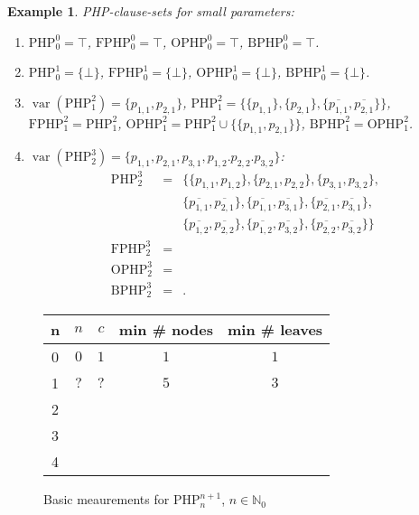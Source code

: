\documentclass{report}
\newtheorem{examp}[defi]{Example}
\newcommand{\set}[1]{\{ #1 \}}
\newcommand{\ol}{\overline}
\newcommand{\NN}{\mathbb{N}}
\newcommand{\NNZ}{\NN_0}
\DeclareMathOperator{\var}{var}
\newcommand{\php}{\mathrm{PHP}}
\newcommand{\fphp}{\mathrm{FPHP}} %
\newcommand{\ophp}{\mathrm{OPHP}} %
\newcommand{\ofphp}{\mathrm{BPHP}} %
\begin{document}
\begin{examp}\label{exp:PHPdef}
  PHP-clause-sets for small parameters:
  \begin{enumerate}
  \item $\php^0_0 = \top$, $\fphp^0_0 = \top$, $\ophp^0_0 = \top$, $\ofphp^0_0 = \top$.
  \item $\php^1_0 = \set{\bot}$, $\fphp^1_0 = \set{\bot}$, $\ophp^1_0 = \set{\bot}$, $\ofphp^1_0 = \set{\bot}$.
  \item $\var(\php^2_1) = \set{p_{1,1},p_{2,1}}$, $\php^2_1 = \set{\set{p_{1,1}}, \set{p_{2,1}}, \set{\ol{p_{1,1}},\ol{p_{2,1}}}}$, $\fphp^2_1 = \php^2_1$, $\ophp^2_1 = \php^2_1 \cup \set{\set{p_{1,1},p_{2,1}}}$, $\ofphp^2_1 = \ophp^2_1$.
  \item $\var(\php^3_2) = \set{p_{1,1},p_{2,1}, p_{3,1},p_{1,2}.p_{2,2}.p_{3,2}}$:
    \begin{eqnarray*}
      \php^3_2 & = & \set{\set{p_{1,1},p_{1,2}},\set{p_{2,1},p_{2,2}},\set{p_{3,1},p_{3,2}},
      \\
      && \set{\ol{p_{1,1}},\ol{p_{2,1}}},\set{\ol{p_{1,1}},\ol{p_{3,1}}},\set{\ol{p_{2,1}},\ol{p_{3,1}}},
      \\
      && \set{\ol{p_{1,2}},\ol{p_{2,2}}},\set{\ol{p_{1,2}},\ol{p_{3,2}}},\set{\ol{p_{2,2}},\ol{p_{3,2}}} }\\
      \fphp^3_2 & = &\\
      \ophp^3_2 & = &\\
      \ofphp^3_2 & = &.
    \end{eqnarray*}
  \end{enumerate}
\end{examp}

\begin{figure}[h]
  \centering
  \begin{tabular}{c|c|c|c|c}
    \hline
    n & $n$ &  $c$ & min \# nodes & min \# leaves \\ \hline
    0 & $0$ & $1$ & $1$ & $1$\\ \hline
    1 & $?$ & $?$ & $5$ & $3$    \\ \hline
    2 &                 &        \\ \hline
    3 &                 &        \\ \hline
    4 &                 &        \\ \hline
    \end{tabular}
  \caption{Basic meaurements for $\php^{n+1}_n$, $n \in \NNZ$}
  \label{fig:basicmeasurement}
\end{figure}
\end{document}
